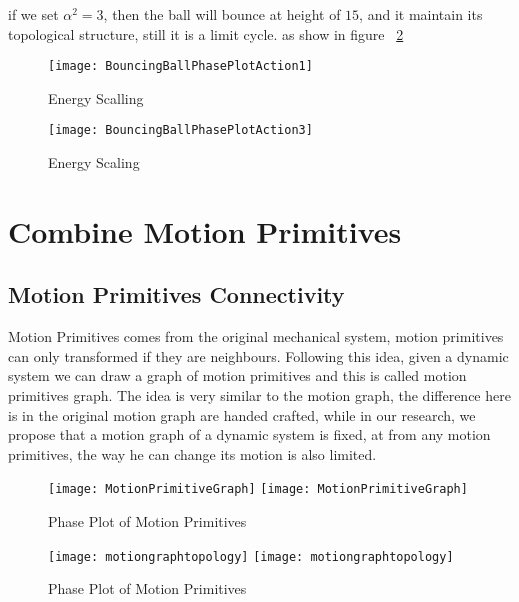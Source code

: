 if we set $\alpha^2=3$, then the ball will bounce at height of $15$, and it maintain its topological structure, still it is a limit cycle.
as show in figure ~\ref{fig:energy3} 


\begin{figure}[!htbp]
  \begin{center}
      \texttt{[image: BouncingBallPhasePlotAction1]}
    \caption{Energy Scalling}
    \label{fig:energy1}
  \end{center}
\end{figure} 


\begin{figure}[!htbp]
  \begin{center}

      \texttt{[image: BouncingBallPhasePlotAction3]}
    \caption{Energy Scaling}
    \label{fig:energy3}
  \end{center}
\end{figure}

\section{Combine Motion Primitives}

\subsection{Motion Primitives Connectivity}
Motion Primitives comes from the original mechanical system, motion primitives can only transformed if they are neighbours.
Following this idea, given a dynamic system we can draw a graph of motion primitives and this is called motion primitives graph.
The idea is very similar to the motion graph, the difference here is in the original motion graph are handed crafted, 
while in our research, we propose that a motion graph of a dynamic system is fixed, at from any motion primitives, the way he can change its motion is also limited.

\begin{figure}[!htbp]
  \begin{center}
    \leavevmode
    \ifpdf
      \texttt{[image: MotionPrimitiveGraph]}
    \else
      \texttt{[image: MotionPrimitiveGraph]}
    \fi
    \caption{Phase Plot of Motion Primitives}
    \label{fig:manyprimitives}
  \end{center}
\end{figure}


\begin{figure}[!htbp]
  \begin{center}
    \leavevmode
    \ifpdf
      \texttt{[image: motiongraphtopology]}
    \else
      \texttt{[image: motiongraphtopology]}
    \fi
    \caption{Phase Plot of Motion Primitives}
    \label{fig:manyprimitives}
  \end{center}
\end{figure}


